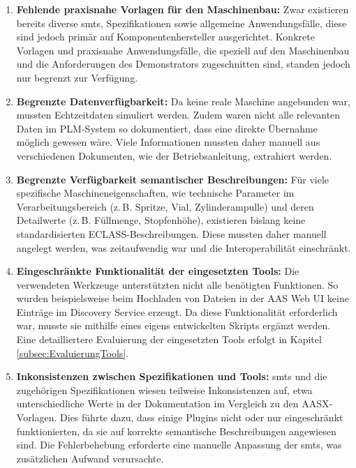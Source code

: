 \begin{enumerate}
    \item \textbf{Fehlende praxisnahe Vorlagen für den Maschinenbau:}  
    Zwar existieren bereits diverse \acsp{smt}, Spezifikationen sowie allgemeine Anwendungsfälle, diese sind jedoch primär auf Komponentenhersteller ausgerichtet.  
    Konkrete Vorlagen und praxisnahe Anwendungsfälle, die speziell auf den Maschinenbau und die Anforderungen des Demonstrators zugeschnitten sind, standen jedoch nur begrenzt zur Verfügung.

    \item \textbf{Begrenzte Datenverfügbarkeit:}  
    Da keine reale Maschine angebunden war, mussten Echtzeitdaten simuliert werden.  
    Zudem waren nicht alle relevanten Daten im PLM-System so dokumentiert, dass eine direkte Übernahme möglich gewesen wäre.  
    Viele Informationen mussten daher manuell aus verschiedenen Dokumenten, wie der Betriebsanleitung, extrahiert werden.  

    \item \textbf{Begrenzte Verfügbarkeit semantischer Beschreibungen:}  
    Für viele spezifische Maschineneigenschaften, wie technische Parameter im Verarbeitungsbereich (z.\,B. Spritze, Vial, Zylinderampulle) und deren Detailwerte (z.\,B. Füllmenge, Stopfenhöhe), existieren bislang keine standardisierten ECLASS-Beschreibungen.  
    Diese mussten daher manuell angelegt werden, was zeitaufwendig war und die Interoperabilität einschränkt.

    \item \textbf{Eingeschränkte Funktionalität der eingesetzten Tools:}  
    Die verwendeten Werkzeuge unterstützten nicht alle benötigten Funktionen.  
    So wurden beispielsweise beim Hochladen von Dateien in der AAS Web UI keine Einträge im Discovery Service erzeugt.  
    Da diese Funktionalität erforderlich war, musste sie mithilfe eines eigens entwickelten Skripts ergänzt werden.  
    Eine detailliertere Evaluierung der eingesetzten Tools erfolgt in Kapitel \ref{subsec:EvaluierungTools}.

    \item \textbf{Inkonsistenzen zwischen Spezifikationen und Tools:}  
    \acsp{smt} und die zugehörigen Spezifikationen wiesen teilweise Inkonsistenzen auf, etwa unterschiedliche Werte in der Dokumentation im Vergleich zu den AASX-Vorlagen.  
    Dies führte dazu, dass einige Plugins nicht oder nur eingeschränkt funktionierten, da sie auf korrekte semantische Beschreibungen angewiesen sind.  
    Die Fehlerbehebung erforderte eine manuelle Anpassung der \acsp{smt}, was zusätzlichen Aufwand verursachte.
\end{enumerate}

